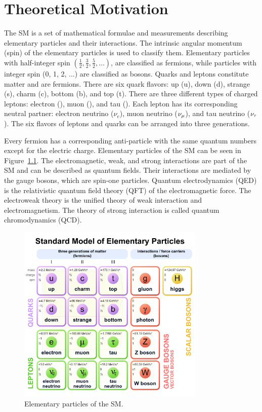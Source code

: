 %
%

\chapter{Theoretical Motivation}
\label{theory}

The SM is a set of mathematical formulae and measurements describing elementary particles and their interactions. The intrinsic angular momentum (spin) of the elementary particles is used to classify them. Elementary particles with half-integer spin $(\frac{1}{2}, \frac{3}{2}, \frac{5}{2}, \ldots)$, are classified as fermions, while particles with integer spin (0, 1, 2, ...) are classified as bosons. Quarks and leptons constitute matter and are fermions. There are six quark flavors: up (u), down (d), strange (s), charm (c), bottom (b), and top (t). There are three different types of charged leptons: electron (\Pe), muon (\Pgm), and tau (\Pgt). Each lepton has its corresponding neutral partner: electron neutrino ($\nu_{e}$), muon neutrino ($\nu_{\mu}$), and tau neutrino ($\nu_{\tau}$). The six flavors of leptons and quarks can be arranged into three generations.

Every fermion has a corresponding anti-particle with the same quantum numbers except for the electric charge. Elementary particles of the SM can be seen in Figure~\ref{fig:sm_particles}. The electromagnetic, weak, and strong interactions are part of the SM and can be described as quantum fields. Their interactions are mediated by the gauge bosons, which are spin-one particles. Quantum electrodynamics (QED) is the relativistic quantum field theory (QFT) of the electromagnetic force. The electroweak theory is the unified theory of weak interaction and electromagnetism. The theory of strong interaction is called quantum chromodynamics (QCD).

\begin{figure}[htbp]
  \centering
  \includegraphics[width=0.8\textwidth]{plots/chapter2/sm_particles.png}
  \caption{Elementary particles of the SM.}
  \label{fig:sm_particles}
\end{figure}


